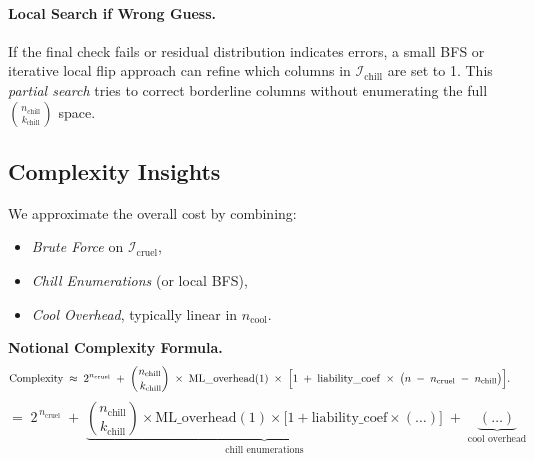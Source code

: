 \documentclass[11pt]{article}
\begin{document}
\paragraph{Local Search if Wrong Guess.}  
If the final check fails or residual distribution indicates errors, a small BFS or iterative local flip approach can refine which columns in $\mathcal{I}_{\mathrm{chill}}$ are set to 1. This \emph{partial search} tries to correct borderline columns without enumerating the full $\binom{n_{\mathrm{chill}}}{k_{\mathrm{chill}}}$ space.

\subsection{Complexity Insights}
\label{subsec:complexity}

We approximate the overall cost by combining:
\begin{itemize}
  \item \emph{Brute Force} on $\mathcal{I}_{\mathrm{cruel}}$,
  \item \emph{Chill Enumerations} (or local BFS),
  \item \emph{Cool Overhead}, typically linear in $n_{\mathrm{cool}}$.
\end{itemize}

\vspace{1em}
\noindent\textbf{Notional Complexity Formula.}
\[
  \text{Complexity} 
  \;\approx\; 
  2^{n_{\mathrm{cruel}}} 
  \;+\;
  \binom{n_{\mathrm{chill}}}{\,k_{\mathrm{chill}}}
  \;\times\;
  \mathrm{ML\_overhead}(1)
  \;\times\;
  \Bigl[
    1 \;+\; \mathrm{liability\_coef}
        \;\times\;
        \bigl(
          n \;-\; n_{\mathrm{cruel}} \;-\; n_{\mathrm{chill}}
        \bigr)
  \Bigr].
\]
\[
  =\; 2^{\,n_{\mathrm{cruel}}} 
     \;+\; 
     \underbrace{\binom{n_{\mathrm{chill}}}{k_{\mathrm{chill}}} 
       \times \mathrm{ML\_overhead}(1) 
       \times
       \bigl[ 1 + \mathrm{liability\_coef}\times(\dots) \bigr]}_{\text{chill enumerations}} 
     \;+\;
     \underbrace{(\dots)}_{\text{cool overhead}}
\]
\end{document}
